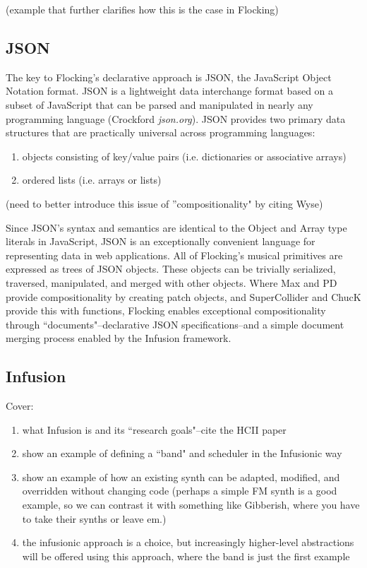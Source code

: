 \documentclass{article}
\begin{document}
(example that further clarifies how this is the case in Flocking)

\subsection{JSON}

The key to Flocking's declarative approach is JSON, the JavaScript Object Notation format. JSON is a lightweight data interchange format based on a subset of JavaScript that can be parsed and manipulated in nearly any programming language (Crockford {\it json.org}). JSON provides two primary data structures that are practically universal across programming languages:

\begin{enumerate}
\item objects consisting of key/value pairs (i.e. dictionaries or associative arrays)
\item ordered lists (i.e. arrays or lists)
\end{enumerate}

(need to better introduce this issue of ''compositionality" by citing Wyse)

Since JSON's syntax and semantics are identical to the Object and Array type literals in JavaScript, JSON is an exceptionally convenient language for representing data in web applications. All of Flocking's musical primitives are expressed as trees of JSON objects. These objects can be trivially serialized, traversed, manipulated, and merged with other objects. Where Max and PD provide compositionality by creating patch objects, and SuperCollider and ChucK provide this with functions, Flocking enables exceptional compositionality through ``documents"--declarative JSON specifications--and a simple document merging process enabled by the Infusion framework.

\subsection{Infusion}

Cover:

\begin{enumerate}
\item what Infusion is and its ``research goals"--cite the HCII paper
\item show an example of defining a ``band" and scheduler in the Infusionic way
\item show an example of how an existing synth can be adapted, modified, and overridden without changing code (perhaps a simple FM synth is a good example, so we can contrast it with something like Gibberish, where you have to take their synths or leave em.)
\item the infusionic approach is a choice, but increasingly higher-level abstractions will be offered using this approach, where the band is just the first example
\end{enumerate}
\end{document}
